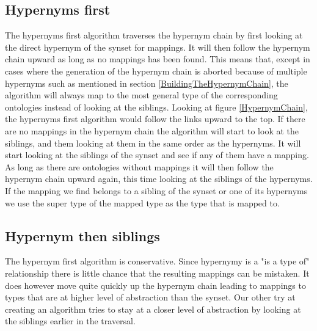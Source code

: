 \subsection{Hypernyms first}
The hypernyms first algorithm traverses the hypernym chain by first looking at the direct hypernym of the synset for mappings.
It will then follow the hypernym chain upward as long as no mappings has been found.
This means that,
except in cases where the generation of the hypernym chain is aborted because of multiple hypernyms such as mentioned in section \ref{BuildingTheHypernymChain},
the algorithm will always map to the most general type of the corresponding ontologies instead of looking at the siblings.
Looking at figure \ref{HypernymChain}, the hypernyms first algorithm would follow the links upward to the top.
If there are no mappings in the hypernym chain the algorithm will start to look at the siblings,
and them looking at them in the same order as the hypernyms.
It will start looking at the siblings of the synset and see if any of them have a mapping.
As long as there are ontologies without mappings it will then follow the hypernym chain upward again,
this time looking at the siblings of the hypernyms.
If the mapping we find belongs to a sibling of the synset or one of its hypernyms we use the super type of the mapped
type as the type that is mapped to.

\subsection{Hypernym then siblings}
The hypernym first algorithm is conservative.
Since hypernymy is a "is a type of" relationship there is little chance that the resulting mappings can be mistaken.
It does however move quite quickly up the hypernym chain leading to mappings to types that are at higher level
of abstraction than the synset.
Our other try at creating an algorithm tries to stay at a closer level of abstraction by looking at the siblings earlier
in the traversal.

